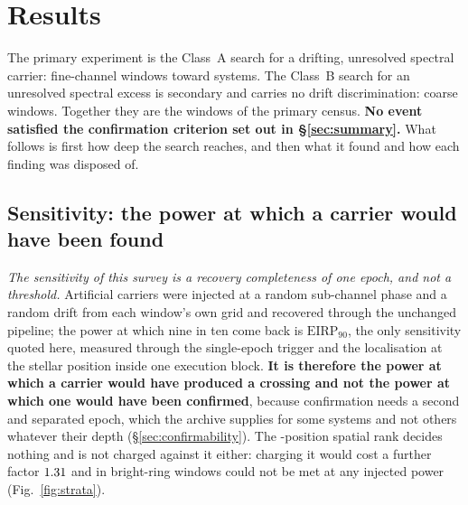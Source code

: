 \section{Results}
\label{sec:results}

The primary experiment is the Class~A search for a drifting, unresolved
spectral carrier: \NWinA{} fine-channel windows toward \NSysClassA{}
systems. The Class~B search for an unresolved spectral excess is secondary
and carries no drift discrimination: \NWinB{} coarse windows. Together they
are the \NWindows{} windows of the primary census. \textbf{No event
satisfied the confirmation criterion set out in \S\ref{sec:summary}.} What
follows is first how deep the search reaches, and then what it found and how
each finding was disposed of.

\subsection{Sensitivity: the power at which a carrier would have been
found} \label{sec:pninetysel}

\emph{The sensitivity of this survey is a recovery completeness of one epoch,
and not a threshold.} Artificial carriers were injected at a random
sub-channel phase and a random drift from each window's own grid and recovered
through the unchanged pipeline; the power at which nine in ten come back is
$\mathrm{EIRP}_{90}$, the only sensitivity quoted here, measured through the
single-epoch trigger and the localisation at the stellar position inside one
execution block. \textbf{It is therefore the power at which a
carrier would have produced a crossing and not the power at which one would
have been confirmed}, because confirmation needs a second and separated epoch,
which the archive supplies for some systems and not others whatever their
depth (\S\ref{sec:confirmability}). The \NCtrl-position spatial rank decides
nothing and is not charged against it either: charging it would cost a further
factor $1.31$ and in \SensNRingHiUnres{} bright-ring windows could not
be met at any injected power (Fig.~\ref{fig:strata}).

